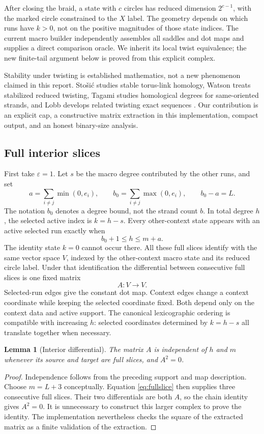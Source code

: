 \documentclass[11pt]{article}
\newtheorem{lemma}[theorem]{Lemma}
\theoremstyle{definition}
\theoremstyle{remark}
\begin{document}
After closing the braid, a state with $c$ circles has reduced dimension $2^{c-1}$, with the marked circle constrained to the $X$ label. The geometry depends on which runs have $k>0$, not on the positive magnitudes of those state indices. The current macro builder independently assembles all saddles and dot maps and supplies a direct comparison oracle. We inherit its local twist equivalence; the new finite-tail argument below is proved from this explicit complex.

Stability under twisting is established mathematics, not a new phenomenon claimed in this report. Sto\v{s}i\'c studies stable torus-link homology, Watson treats stabilized reduced twisting, Tagami studies homological degrees for same-oriented strands, and Lobb develops related twisting exact sequences \cite{stosic,watson,tagami,lobb_twist}. Our contribution is an explicit cap, a constructive matrix extraction in this implementation, compact output, and an honest binary-size analysis.

\subsection{Full interior slices}
First take $\varepsilon=1$. Let $s$ be the macro degree contributed by the other runs, and set
\[
 a=\sum_{i\ne j}\min(0,e_i),\qquad
 b_0=\sum_{i\ne j}\max(0,e_i),\qquad b_0-a=L.
\]
The notation $b_0$ denotes a degree bound, not the strand count $b$.
In total degree $h$, the selected active index is $k=h-s$. Every other-context state appears with an active selected run exactly when
\begin{equation}
 b_0+1\le h\le m+a.
 \label{eq:fullslice}
\end{equation}
The identity state $k=0$ cannot occur there. All these full slices identify with the same vector space $V$, indexed by the other-context macro state and its reduced circle label. Under that identification the differential between consecutive full slices is one fixed matrix
\[
 A:V\longrightarrow V.
\]
Selected-run edges give the constant dot map. Context edges change a context coordinate while keeping the selected coordinate fixed. Both depend only on the context data and active support. The canonical lexicographic ordering is compatible with increasing $h$: selected coordinates determined by $k=h-s$ all translate together when necessary.

\begin{lemma}[Interior differential]
The matrix $A$ is independent of $h$ and $m$ whenever its source and target are full slices, and $A^2=0$.
\end{lemma}
\begin{proof}
Independence follows from the preceding support and map description. Choose $m=L+3$ conceptually. Equation \eqref{eq:fullslice} then supplies three consecutive full slices. Their two differentials are both $A$, so the chain identity gives $A^2=0$. It is unnecessary to construct this larger complex to prove the identity. The implementation nevertheless checks the square of the extracted matrix as a finite validation of the extraction.
\end{proof}
\end{document}
